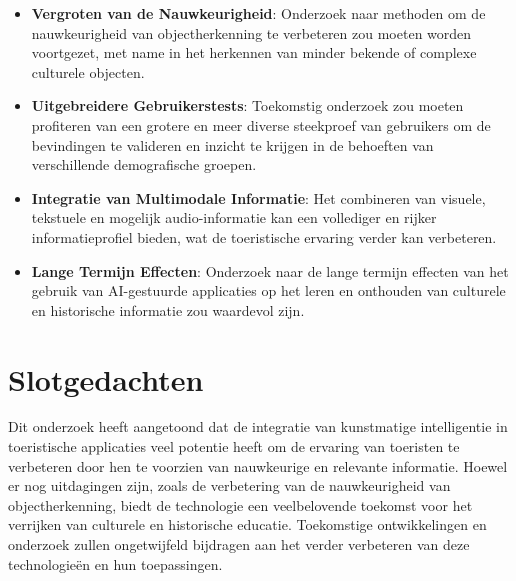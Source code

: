 \begin{itemize}
    \item \textbf{Vergroten van de Nauwkeurigheid}: Onderzoek naar methoden om de nauwkeurigheid van objectherkenning te verbeteren zou moeten worden voortgezet, met name in het herkennen van minder bekende of complexe culturele objecten.
    \item \textbf{Uitgebreidere Gebruikerstests}: Toekomstig onderzoek zou moeten profiteren van een grotere en meer diverse steekproef van gebruikers om de bevindingen te valideren en inzicht te krijgen in de behoeften van verschillende demografische groepen.
    \item \textbf{Integratie van Multimodale Informatie}: Het combineren van visuele, tekstuele en mogelijk audio-informatie kan een vollediger en rijker informatieprofiel bieden, wat de toeristische ervaring verder kan verbeteren.
    \item \textbf{Lange Termijn Effecten}: Onderzoek naar de lange termijn effecten van het gebruik van AI-gestuurde applicaties op het leren en onthouden van culturele en historische informatie zou waardevol zijn.
\end{itemize}
\section{Slotgedachten}
Dit onderzoek heeft aangetoond dat de integratie van kunstmatige intelligentie in toeristische applicaties veel potentie heeft om de ervaring van toeristen te verbeteren door hen te voorzien van nauwkeurige en relevante informatie. Hoewel er nog uitdagingen zijn, zoals de verbetering van de nauwkeurigheid van objectherkenning, biedt de technologie een veelbelovende toekomst voor het verrijken van culturele en historische educatie. Toekomstige ontwikkelingen en onderzoek zullen ongetwijfeld bijdragen aan het verder verbeteren van deze technologieën en hun toepassingen.
